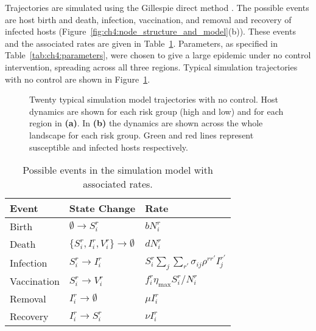 Trajectories are simulated using the Gillespie direct method \citep{gillespie_exact_1977}. The possible events are host birth and death, infection, vaccination, and removal and recovery of infected hosts (Figure~\ref{fig:ch4:node_structure_and_model}(b)). These events and the associated rates are given in Table~\ref{tab:ch4:rates}. Parameters, as specified in Table~\ref{tab:ch4:parameters}, were chosen to give a large epidemic under no control intervention, spreading across all three regions. Typical simulation trajectories with no control are shown in Figure~\ref{fig:ch4:no_control_dpc}.

\vspace*{\floatsep}
\begin{figure}[htb]
    \begin{center}
        \caption[Uncontrolled network model dynamics]{Twenty typical simulation model trajectories with no control. Host dynamics are shown for each risk group (high and low) and for each region in \textbf{(a)}. In \textbf{(b)} the dynamics are shown across the whole landscape for each risk group. Green and red lines represent susceptible and infected hosts respectively.\label{fig:ch4:no_control_dpc}}
    \end{center}
\end{figure}

\begin{table}[htb]
    \centering
    \caption[Possible events in the simulation model]{Possible events in the simulation model with associated rates.\label{tab:ch4:rates}}
    \begin{tabular}{@{}lll@{}}
        \toprule
        \textbf{Event} & \textbf{State Change} & \textbf{Rate} \\
        \midrule
        Birth & $\emptyset \rightarrow S_i^r$ & $bN_i^r$\\
        Death & $\{S_i^r,I_i^r,V_i^r\} \rightarrow \emptyset$ & $dN_i^r$ \\
        Infection & $S_i^r \rightarrow I_i^r$ & $S_i^r\sum_{j}\sum_{r'}\sigma_{ij}\rho^{rr'}I_j^{r'}$\\
        Vaccination & $S_i^r \rightarrow V_i^r$ & $f_i^r\eta_{\textrm{max}}S_i^r / N_i^r$\\
        Removal & $I_i^r \rightarrow \emptyset$ & $\mu{}I_i^r$\\
        Recovery & $I_i^r \rightarrow S_i^r$ & $\nu{}I_i^r$\\
        \bottomrule
    \end{tabular}
\end{table}
        
